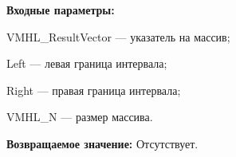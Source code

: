 \textbf{Входные параметры:}

 VMHL\_ResultVector --- указатель на массив;
 
 Left --- левая граница интервала;
 
 Right --- правая граница интервала;
 
 VMHL\_N --- размер массива.

\textbf{Возвращаемое значение:}
Отсутствует.